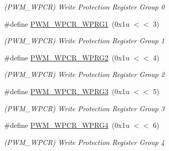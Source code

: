 \begin{DoxyCompactItemize}
\begin{DoxyCompactList}\small\item\em (P\+W\+M\+\_\+\+W\+P\+CR) Write Protection Register Group 0 \end{DoxyCompactList}\item 
\mbox{\label{group__SAMS70__PWM_ga22bbd2f5f339ce837464c918b42947e4}} 
\#define \mbox{\hyperlink{group__SAMS70__PWM_ga22bbd2f5f339ce837464c918b42947e4}{P\+W\+M\+\_\+\+W\+P\+C\+R\+\_\+\+W\+P\+R\+G1}}~(0x1u $<$$<$ 3)
\begin{DoxyCompactList}\small\item\em (P\+W\+M\+\_\+\+W\+P\+CR) Write Protection Register Group 1 \end{DoxyCompactList}\item 
\mbox{\label{group__SAMS70__PWM_gac162ea420e73732f2377033303f5513e}} 
\#define \mbox{\hyperlink{group__SAMS70__PWM_gac162ea420e73732f2377033303f5513e}{P\+W\+M\+\_\+\+W\+P\+C\+R\+\_\+\+W\+P\+R\+G2}}~(0x1u $<$$<$ 4)
\begin{DoxyCompactList}\small\item\em (P\+W\+M\+\_\+\+W\+P\+CR) Write Protection Register Group 2 \end{DoxyCompactList}\item 
\mbox{\label{group__SAMS70__PWM_ga2459c32b0e27b05eacfdd943c706fad5}} 
\#define \mbox{\hyperlink{group__SAMS70__PWM_ga2459c32b0e27b05eacfdd943c706fad5}{P\+W\+M\+\_\+\+W\+P\+C\+R\+\_\+\+W\+P\+R\+G3}}~(0x1u $<$$<$ 5)
\begin{DoxyCompactList}\small\item\em (P\+W\+M\+\_\+\+W\+P\+CR) Write Protection Register Group 3 \end{DoxyCompactList}\item 
\mbox{\label{group__SAMS70__PWM_ga76c582a235a049238238cde31dffd8ed}} 
\#define \mbox{\hyperlink{group__SAMS70__PWM_ga76c582a235a049238238cde31dffd8ed}{P\+W\+M\+\_\+\+W\+P\+C\+R\+\_\+\+W\+P\+R\+G4}}~(0x1u $<$$<$ 6)
\begin{DoxyCompactList}\small\item\em (P\+W\+M\+\_\+\+W\+P\+CR) Write Protection Register Group 4 \end{DoxyCompactList}\item 
\mbox{\label{group__SAMS70__PWM_gaa3d7f99067043f6c0384045de15cefe2}} 

\end{DoxyCompactItemize}
